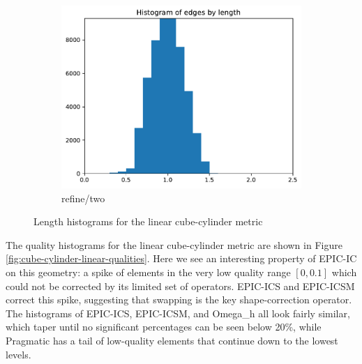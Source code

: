 \documentclass[3p,times,procedia,number]{elsarticle}
\begin{document}
\begin{figure}
\begin{subfigure}{.16\textwidth}
\includegraphics[width=\textwidth]{refine-two-cube-cylinder-linear-length.pdf}
\caption{refine/two}
\end{subfigure}
\caption{Length histograms for the linear cube-cylinder metric}
\label{fig:cube-cylinder-linear-lengths}
\end{figure}

The quality histograms for the linear cube-cylinder metric
are shown in Figure \ref{fig:cube-cylinder-linear-qualities}.
Here we see an interesting property of EPIC-IC on this geometry:
a spike of elements in the very low quality range $[0,0.1]$
which could not be corrected by its limited set of operators.
EPIC-ICS and EPIC-ICSM correct this spike, suggesting that
swapping is the key shape-correction operator.
The histograms of EPIC-ICS, EPIC-ICSM, and Omega\_h all look fairly
similar, which taper until no significant percentages can be
seen below 20\%, while Pragmatic has a tail of low-quality
elements that continue down to the lowest levels.
\end{document}
